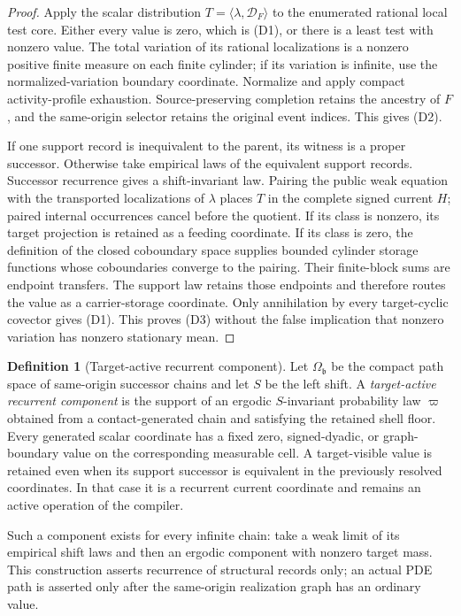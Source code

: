 \documentclass[11pt]{article}
\numberwithin{section}{part}
\theoremstyle{plain}
\theoremstyle{definition}
\newtheorem{definition}[definition]{Definition}
\theoremstyle{remark}
\begin{document}
\begin{proof}
Apply the scalar distribution
\(T=\langle\lambda,\mathcal D_F\rangle\) to the enumerated rational local test
core.  Either every value is zero, which is \textup{(D1)}, or there is a
least test with nonzero value.  The total variation of its rational
localizations is a nonzero positive finite measure on each finite cylinder;
if its variation is infinite, use the normalized-variation boundary
coordinate.  Normalize and apply compact activity-profile exhaustion.
Source-preserving completion retains the ancestry of \(F\), and the
same-origin selector retains the original event indices.  This gives
\textup{(D2)}.

If one support record is inequivalent to the parent, its witness is a proper
successor.  Otherwise take empirical laws of the equivalent support records.
Successor recurrence gives a shift-invariant law.  Pairing the public weak
equation with the transported localizations of \(\lambda\) places \(T\) in
the complete signed current \(H\); paired internal occurrences cancel before
the quotient.  If its class is nonzero, its target projection is retained as
a feeding coordinate.  If its class is zero, the definition of the closed
coboundary space supplies bounded cylinder storage functions whose
coboundaries converge to the pairing.  Their finite-block sums are endpoint
transfers.  The support law retains those endpoints and therefore routes the
value as a carrier-storage coordinate.  Only annihilation by every
target-cyclic covector gives \textup{(D1)}.  This proves \textup{(D3)} without
the false implication that nonzero variation has nonzero stationary mean.
\end{proof}

\begin{definition}[Target-active recurrent component]
\label{def:target-active-recurrent-component}
Let \(\Omega_{\mathfrak b}\) be the compact path space of same-origin
successor chains and let \(S\) be the left shift.  A \emph{target-active
recurrent component} is the support of an ergodic \(S\)-invariant probability
law \(\varpi\) obtained from a contact-generated chain and satisfying the
retained shell floor.  Every generated scalar coordinate has a fixed zero,
signed-dyadic, or graph-boundary value on the corresponding measurable cell.
A target-visible value is retained even when its support successor is
equivalent in the previously resolved coordinates.  In that case it is a
recurrent current coordinate and remains an active operation of the compiler.

Such a component exists for every infinite chain: take a weak limit of its
empirical shift laws and then an ergodic component with nonzero target mass.
This construction asserts recurrence of structural records only; an actual
PDE path is asserted only after the same-origin realization graph has an
ordinary value.
\end{definition}
\end{document}
